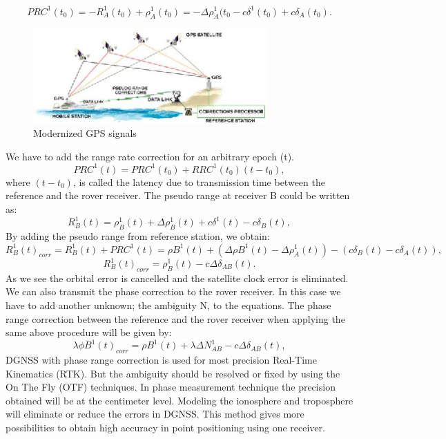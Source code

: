 \begin{equation}
	\label{equ:diferential_pos2}
	PRC^{1}(t_{0}) = -R^{1}_{A}(t_{0}) + \rho^{1}_{A}(t_{0}) = -\Delta \rho^{1}_{A}(t_{0}
	- c \delta^{1}(t_{0}) + c \delta_{A}(t_{0}).
\end{equation}

\begin{figure}[htb] 
	\label{fig:gps_correction}
	\centering
	\includegraphics[width=0.8\textwidth]{figures/gps_correction}
	\caption{Modernized GPS signals}
\end{figure}
We have to add the range rate correction for an arbitrary epoch (t).
\begin{equation}
	\label{equ:range_rate_correction}
	PRC^{1}(t) = PRC^{1}(t_{0}) + RRC^{1}(t_{0})(t-t_{0}),
\end{equation}
where $(t-t_{0})$, is called the latency due to transmission time between  the reference and 
the rover receiver.
The pseudo range at receiver B could be written as:
\begin{equation}
	\label{equ:reciever_pseudorange}
	R_{B}^{1}(t) = \rho^{1}_{B}(t) + \Delta \rho^{1}_{B}(t) + c \delta^{1}(t)- c \delta_{B}(t),
\end{equation}
By adding the pseudo range from reference station, we obtain:
\begin{equation}
	\label{equ:pseudorange_with_ref1}
	R_{B}^{1}(t)_{corr} = R_{B}^{1}(t) + PRC^{1}(t) = \rho B^{1}(t)+(\Delta \rho B^{1}(t)-
	\Delta \rho^{1}_{A}(t)) - ( c \delta_{B}(t) - c \delta_{A}(t)),
\end{equation}
\begin{equation}
	\label{equ:pseudorange_with_ref2}
	R_{B}^{1}(t)_{corr} = \rho^{1}_{B}(t) - c \Delta \delta_{AB}(t).
\end{equation}
As we see the orbital error is cancelled and the satellite clock error is eliminated. We can also
transmit the phase correction to the rover receiver. In this case we have to add another unknown;
the ambiguity N, to the equations. The phase range correction between the reference and the
rover receiver when applying the same above procedure will be given by:
\begin{equation}
	\label{equ:phase_label_corr}
	\lambda \phi B^{1}(t)_{corr} = \rho B^{1}(t)+\lambda \Delta N^{1}_{AB}-c\Delta \delta_{AB}(t),
\end{equation}
DGNSS with phase range correction is used for most precision Real-Time Kinematics (RTK).
But the ambiguity should be resolved or fixed by using the On The Fly (OTF) techniques. In
phase measurement technique the precision obtained will be at the centimeter level. Modeling
the ionosphere and troposphere will eliminate or reduce the errors in DGNSS. This method gives
more possibilities to obtain high accuracy in point positioning using one receiver.

